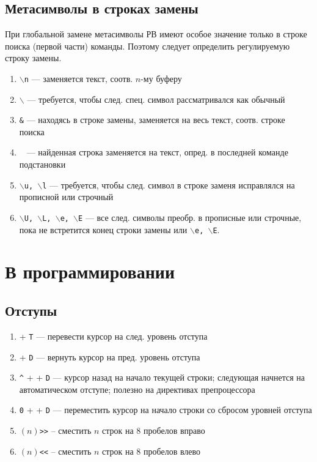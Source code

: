 \documentclass[a4paper,10pt, twocolumn]{article}
\newcommand*{\cod}[1]{\texttt{#1}}
\begin{document}
\subsection{Метасимволы в строках замены}
При глобальной замене метасимволы РВ имеют особое значение только в строке поиска (первой части) команды. Поэтому следует определить регулируемую строку замены.
\begin{enumerate}
    \item \cod{$\backslash$n} --- заменяется текст, соотв. $n$-му буферу
    \item \cod{$\backslash$} --- требуется, чтобы след. спец. символ рассматривался как обычный
    \item \cod{\&} --- находясь в строке замены, заменяется на весь текст, соотв. строке поиска
    \item \cod{~} --- найденная строка заменяется на текст, опред. в последней команде подстановки
    \item \cod{$\backslash$u, $\backslash$l} --- требуется, чтобы след. символ в строке заменя исправлялся на прописной или строчный
    \item \cod{$\backslash$U, $\backslash$L, $\backslash$e, $\backslash$E} --- все след. символы преобр. в прописные или строчные, пока не встретится конец строки замены или \cod{$\backslash$e, $\backslash$E}.
\end{enumerate}

\section{В программировании}
\subsection{Отступы}
\begin{enumerate}
    \item \Ctrl + \cod{T} --- перевести курсор на след. уровень отступа
    \item \Ctrl + \cod{D} --- вернуть курсор на пред. уровень отступа
    \item \cod{\^} + \Ctrl + \cod{D} --- курсор назад на начало текущей строки; следующая начнется на автоматическом отступе; полезно на директивах препроцессора
    \item \cod{0} + \Ctrl + \cod{D} --- переместить курсор на начало строки со сбросом уровней отступа
    \item $(n)$\cod{>>} -- сместить $n$ строк на 8 пробелов вправо
    \item $(n)$\cod{<<} -- сместить $n$ строк на 8 пробелов влево
\end{enumerate}
\end{document}
